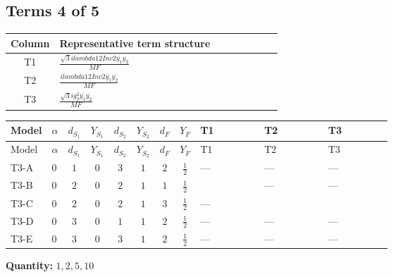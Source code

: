\documentclass[8pt]{article}
\begin{document}
\begin{landscape}
\subsection*{Terms 4 of 5}
\begin{center}
\begin{tabular}{@{}c >{\raggedright\arraybackslash}p{0.82\linewidth}@{}}
\toprule
Column & Representative term structure \\
\midrule
T1 & \(\displaystyle \frac{\sqrt{3} i lambda12Inv2 \overline{y_{1}} \overline{y_{2}}}{MF}\) \\
\midrule
T2 & \(\displaystyle \frac{i lambda12Inv2 \overline{y_{1}} \overline{y_{2}}}{MF}\) \\
\midrule
T3 & \(\displaystyle \frac{\sqrt{3} i g_{2}^{2} \overline{y_{1}} \overline{y_{2}}}{MF}\) \\
\midrule
\bottomrule
\end{tabular}
\end{center}
\smallskip
\tiny
\begin{longtable}{@{}llcccccc >{\raggedright\arraybackslash}p{0.21\linewidth} >{\raggedright\arraybackslash}p{0.21\linewidth} >{\raggedright\arraybackslash}p{0.21\linewidth}@{}}
\toprule
Model & $\alpha$ & $d_{S_1}$ & $Y_{S_1}$ & $d_{S_2}$ & $Y_{S_2}$ & $d_F$ & $Y_F$ & T1 & T2 & T3 \\
\midrule
\endfirsthead
\toprule
Model & $\alpha$ & $d_{S_1}$ & $Y_{S_1}$ & $d_{S_2}$ & $Y_{S_2}$ & $d_F$ & $Y_F$ & T1 & T2 & T3 \\
\midrule
\endhead
T3-A & $0$ & $1$ & $0$ & $3$ & $1$ & $2$ & $\frac{1}{2}$ & --- & --- & --- \\
\midrule
T3-B & $0$ & $2$ & $0$ & $2$ & $1$ & $1$ & $\frac{1}{2}$ & \scriptsize\adjustbox{max width=\linewidth}{$\begin{gathered} \frac{\sqrt{3} i lambda12Inv2 \overline{y_{1}} \overline{y_{2}}}{6 MF}\end{gathered}$} & --- & --- \\
\midrule
T3-C & $0$ & $2$ & $0$ & $2$ & $1$ & $3$ & $\frac{1}{2}$ & --- & \scriptsize\adjustbox{max width=\linewidth}{$\begin{gathered} - \frac{i lambda12Inv2 \overline{y_{1}} \overline{y_{2}}}{6 MF}\end{gathered}$} & \scriptsize\adjustbox{max width=\linewidth}{$\begin{gathered} - \frac{\sqrt{3} i g_{2}^{2} \overline{y_{1}} \overline{y_{2}}}{8 MF}\end{gathered}$} \\
\midrule
T3-D & $0$ & $3$ & $0$ & $1$ & $1$ & $2$ & $\frac{1}{2}$ & --- & --- & --- \\
\midrule
T3-E & $0$ & $3$ & $0$ & $3$ & $1$ & $2$ & $\frac{1}{2}$ & --- & --- & --- \\
\midrule
\bottomrule
\end{longtable}
\clearpage
\noindent\textbf{Quantity: }$\mathrm{1,2,5,10}$\par\smallskip

\end{landscape}
\end{document}
